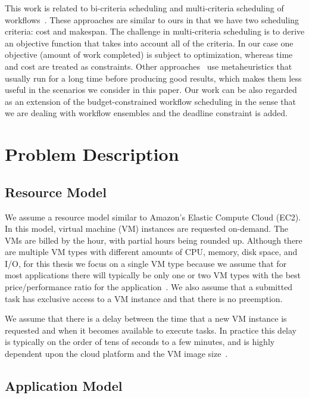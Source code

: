 \documentclass[conference]{IEEEtran}
\begin{document}
This work is related to bi-criteria scheduling and multi-criteria scheduling of
workflows~\cite{Wieczorek2009,Prodan2010,Dongarra2007}. These approaches are
similar to ours in that we have two scheduling criteria: cost and makespan. The
challenge in multi-criteria scheduling is to derive an objective function that
takes into account all of the criteria. In our case one objective (amount
of work completed) is subject to optimization, whereas time and cost are
treated as constraints. Other approaches~\cite{Talukder2009,Pandey2010} use
metaheuristics that usually run for a long time before producing good results,
which makes them less useful in the scenarios we consider in this paper. Our work can be also
regarded as an extension of the budget-constrained workflow scheduling
\cite{Sakellariou2007} in the sense that we are dealing with workflow ensembles
and the deadline constraint is added.
 
\section{Problem Description}
\label{sec:problem}

\subsection{Resource Model}

We assume a resource model similar to Amazon's Elastic Compute Cloud (EC2). In this model, virtual machine (VM) instances are requested on-demand. The VMs are billed by the hour, with partial hours being rounded up. Although there are multiple VM types with different amounts of CPU, memory, disk space, and I/O, for this thesis we focus on a single VM type because we assume that for most applications there will typically be only one or two VM types with the best price/performance ratio for the application~\cite{Juve2009}. We also assume that a submitted task has exclusive access to a VM instance and that there is no preemption.

We assume that there is a delay between the time that a new VM instance is requested and when it becomes available to execute tasks. In practice this delay is typically on the order of tens of seconds to a few minutes, and is highly dependent upon the cloud platform and the VM image size~\cite{Nurmi2008b}.


\subsection{Application Model}
\end{document}
